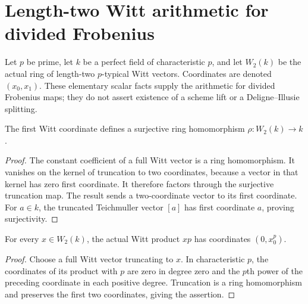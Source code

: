 \section{Length-two Witt arithmetic for divided Frobenius}
\label{sec:witt-two-arithmetic}

Let $p$ be prime, let $k$ be a perfect field of
characteristic $p$, and let $W_2(k)$ be the actual ring
of length-two $p$-typical Witt vectors. Coordinates
are denoted $(x_0,x_1)$. These elementary scalar facts
supply the arithmetic for divided Frobenius maps;
they do not assert existence of a scheme lift or a
Deligne--Illusie splitting.

\begin{definition}
\label{def:witt-two-reduction}
\leanok
{}
The first Witt coordinate defines a surjective ring
homomorphism $\rho:W_2(k)\to k$.
\end{definition}
\begin{proof}
The constant coefficient of a full Witt vector is a
ring homomorphism. It vanishes on the kernel of
truncation to two coordinates, because a vector in
that kernel has zero first coordinate. It therefore
factors through the surjective truncation map. The
result sends a two-coordinate vector to its first
coordinate. For $a\in k$, the truncated Teichmuller
vector $[a]$ has first coordinate $a$, proving
surjectivity.
\end{proof}

\begin{lemma}
\label{lem:witt-two-prime-coordinates}
\leanok
{}
For every $x\in W_2(k)$, the actual Witt product
$x p$ has coordinates $(0,x_0^p)$.
\end{lemma}
\begin{proof}
Choose a full Witt vector truncating to $x$. In
characteristic $p$, the coordinates of its product
with $p$ are zero in degree zero and the $p$th power
of the preceding coordinate in each positive degree.
Truncation is a ring homomorphism and preserves the
first two coordinates, giving the assertion.
\end{proof}

